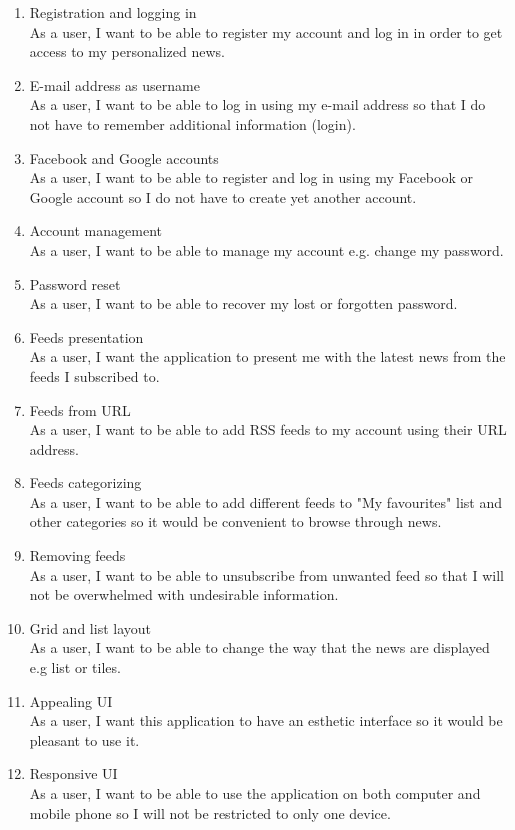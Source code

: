 \documentclass[]{article}
\begin{document}
\begin{enumerate}
	\item Registration and logging in\\
	As a user, I want to be able to register my account and log in in order to get access to my personalized news. 
	
	\item E-mail address as username\\
	As a user, I want to be able to log in using my e-mail address so that I do not have to remember additional information (login).
	
	\item Facebook and Google accounts\\
	As a user, I want to be able to register and log in using my Facebook or Google account so I do not have to create yet another account.
	
	\item Account management\\
	As a user, I want to be able to manage my account e.g. change my password.
	
	\item Password reset\\
	As a user, I want to be able to recover my lost or forgotten password.
	
	\item Feeds presentation\\
	As a user, I want the application to present me with the latest news from the feeds I subscribed to.
	
	\item Feeds from URL\\
	As a user, I want to be able to add RSS feeds to my account using their URL address.
	
	\item Feeds categorizing\\
	As a user, I want to be able to add different feeds to "My favourites" list and other categories so it would be convenient to browse through news.
	
	\item Removing feeds\\
	As a user, I want to be able to unsubscribe from unwanted feed so that I will not be overwhelmed with undesirable information. 
	
	\item Grid and list layout\\
	As a user, I want to be able to change the way that the news are displayed e.g list or tiles.
	
	\item Appealing UI\\
	As a user, I want this application to have an esthetic interface so it would be pleasant to use it.
	
	\item Responsive UI\\
	As a user, I want to be able to use the application on both computer and mobile phone so I will not be restricted to only one device.
\end{enumerate}
\end{document}
